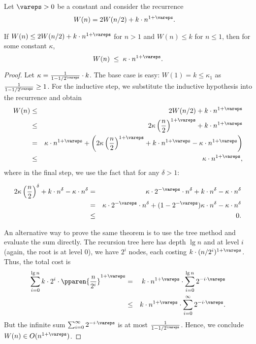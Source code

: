 \begin{flex}
\label{grp:thm:analysis::recurrences::linear-plus}

\begin{theorem}
\label{thm:analysis::recurrences::linear-plus}
Let $\vareps > 0$ be a
constant and consider  the recurrence
\[ \begin{align*}
  W(n) & = 2W(n/2) + k\cdot n^{1+\vareps}.
\end{align*} \]

    If $W(n) \leq 2 W(n/2) + k \cdot n^{1+\vareps}$ for $n > 1$ and $W(n) \leq k$ for $n \leq
  1$, then for some constant $\kappa$, \[ W(n) \;\leq\;
  \kappa \cdot n^{1+\vareps}. \]

\end{theorem}

\begin{proof}
\label{prf:analysis::recurrences::inductive}
  Let $\kappa = \frac1{1-1/2^{\vareps}} \cdot k$. The base case is easy: $W(1) =
  k \leq \kappa_1$ as $\frac1{1 - 1/2^{\vareps}} \geq 1$.  For the inductive
  step, we substitute the inductive hypothesis into the recurrence and obtain
  \begin{eqnarray*}
    W(n) &\leq& 2W(n/2) + k \cdot n^{1+\vareps}\\
    &\leq& 2 \kappa\left(\frac{n}2 \right)^{1+\vareps} + k \cdot n^{1+\vareps}\\
    &=& \kappa \cdot n^{1+\vareps} + \left(2 \kappa\left(\frac{n}2 \right)^{1+\vareps} +
      k \cdot n^{1+\vareps} - \kappa \cdot n^{1+\vareps}\right)\\
    &\leq& \kappa \cdot n^{1+\vareps},
  \end{eqnarray*}
  where in the final step, we use the fact  that for any $\delta > 1$:

  \begin{eqnarray*}
    2 \kappa\left(\frac{n}2 \right)^{\delta} +
    k \cdot n^{\delta} - \kappa \cdot n^{\delta}
    &=& \kappa \cdot 2^{-\vareps} \cdot n^{\delta}  +
    k \cdot n^{\delta} - \kappa \cdot n^{\delta} \\
    &=& \kappa \cdot 2^{-\vareps} \cdot n^{\delta}  +
    (1 - 2^{-\vareps})\kappa\cdot n^{\delta} - \kappa \cdot n^{\delta} \\
    &\leq& 0.
  \end{eqnarray*}


An alternative way to prove the same theorem is to use the tree method
and evaluate the sum directly. The recursion tree here has depth $\lg
n$ and at level $i$ (again, the root is at level $0$), we have $2^i$
nodes, each costing $k\cdot (n/2^i)^{1+\vareps}$.  Thus, the total
cost is
  \begin{eqnarray*}
    \sum_{i=0}^{\lg n} k\cdot 2^i \cdot \pparen{\frac{n}{2^i}}^{1+\vareps}
    &=&  k\cdot n^{1+\vareps} \cdot \sum_{i=0}^{\lg n} 2^{-i\cdot\vareps} \\
    &\leq& k\cdot n^{1+\vareps} \cdot \sum_{i=0}^{\infty} 2^{-i\cdot\vareps}.
  \end{eqnarray*}
  But the infinite sum $\sum_{i=0}^{\infty} 2^{-i\cdot\vareps}$ is at most
  $\frac1{1 - 1/2^{\vareps}}$. Hence, we conclude $W(n) \in O(n^{1+\vareps})$.


\end{proof}
\end{flex}
